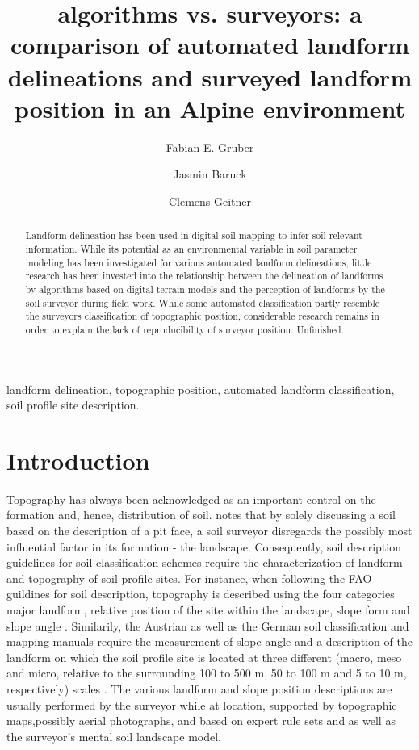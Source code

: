 \documentclass[final,1p,times,twocolumn,authoryear]{elsarticle}
\begin{document}
\begin{frontmatter}

\title{algorithms vs. surveyors: a comparison of automated landform delineations and surveyed landform position in an Alpine environment}


\author{Fabian E. Gruber}
\author{Jasmin Baruck}
\author{Clemens Geitner}

\address{University of Innsbruck}

\begin{abstract}
Landform delineation has been used in digital soil mapping to infer soil-relevant information. While its potential as an environmental variable in soil parameter modeling has been investigated for various automated landform delineations, little research has been invested into the relationship between the delineation of landforms by algorithms based on digital terrain models and the perception of landforms by the soil surveyor during field work.
While some automated classification partly resemble the surveyors classification of topographic position, considerable research remains in order to explain the lack of reproducibility of surveyor position. Unfinished.
\end{abstract}

\begin{keyword}
landform delineation, topographic position, automated landform classification, soil profile site description.
\end{keyword}

\end{frontmatter}

\linenumbers

\section{Introduction}
Topography has always been acknowledged as an important control on the formation and, hence, distribution of soil. \cite{Schaetzl2013} notes that by solely discussing a soil based on the description of a pit face, a soil surveyor disregards the possibly most influential factor in its formation - the landscape.	Consequently, soil description guidelines for soil classification schemes require the characterization of landform and topography of soil profile sites. For instance, when following the FAO guildines for soil description, topography is described using the four categories major landform, relative position of the site within the landscape, slope form and slope angle \citep{FAO2006}. Similarily, the Austrian \citep{Nestroy2011} as well as the German soil classification and mapping manuals \citep{ArbeitsgruppeBoden2006} require the measurement of slope angle and a description of the landform on which the soil profile site is located at three different (macro, meso and micro, relative to the surrounding 100 to 500 m, 50 to 100 m and 5 to 10 m, respectively) scales \citep{Englisch1998}. The various landform and slope position descriptions are usually performed by the surveyor while at location, supported by topographic maps,possibly aerial photographs, and based on expert rule sets and as well as the surveyor's mental soil landscape model. 
\end{document}
